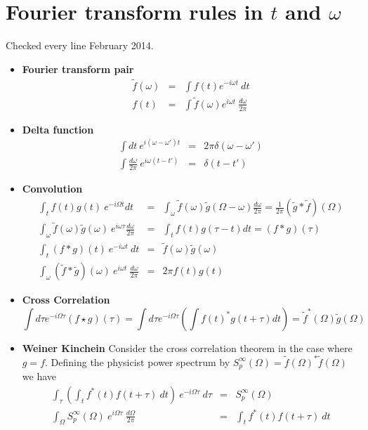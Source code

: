 \documentclass{article}
\begin{document}
\section*{Fourier transform rules in $t$ and $\omega$}

Checked every line February 2014.

\begin{itemize}
\item \textbf{Fourier transform pair} \begin{eqnarray*}
\tilde{f}(\omega) & = & \int f(t)e^{-i\omega t}~dt\\
f(t) & = & \int\tilde{f}(\omega)e^{i\omega t}~\frac{d\omega}{2\pi}\end{eqnarray*}

\item \textbf{Delta function} \begin{eqnarray*}
\int dt~e^{i(\omega-\omega')t} & = & 2\pi\delta(\omega-\omega')\\
\int\frac{d\omega}{2\pi}~e^{i\omega(t-t')} & = & \delta(t-t')\end{eqnarray*}

\item \textbf{Convolution} \begin{eqnarray*}
\int_{t}f(t)g(t)~e^{-i\Omega t}dt & = & \int_{\omega}\tilde{f}(\omega)\tilde{g}(\Omega-\omega)\frac{d\omega}{2\pi}=\frac{1}{2\pi}(\tilde{g}*\tilde{f})(\Omega)\\
\int_{\omega}\tilde{f}(\omega)\tilde{g}(\omega)~e^{i\omega\tau}\frac{d\omega}{2\pi} & = & \int_{t}f(t)g(\tau-t)dt=(f*g)(\tau)\\
\int_{t}(f*g)(t)~e^{-i\omega t}~dt & = & \tilde{f}(\omega)\tilde{g}(\omega)\\
\int_{\omega}(\tilde{f}*\tilde{g})(\omega)~e^{i\omega t}~\frac{d\omega}{2\pi} & = & 2\pi f(t)g(t)\end{eqnarray*}

\item \textbf{Cross Correlation}\begin{equation}
\int d\tau e^{-i\Omega\tau}\left(f\star g\right)(\tau) = \int d\tau e^{-i\Omega\tau}\left(\int f(t)^{*}g(t+\tau)dt\right)=\tilde{f}^{*}(\Omega)\tilde{g}(\Omega) \nonumber \end{equation}

\item \textbf{Weiner Kinchein} Consider the cross correlation theorem in
the case where $g=f$. Defining the physicist power spectrum by $S_{p}^{\infty}(\Omega)=\tilde{f}(\Omega)^{*}\tilde{f}(\Omega)$
we have \begin{eqnarray*}
\int_{\tau}\left(\int_{t}f^{*}(t)f(t+\tau)~dt\right)~e^{-i\Omega\tau}~d\tau & = & S_{p}^{\infty}(\Omega)\\
\int_{\Omega}S_{p}^{\infty}(\Omega)~e^{i\Omega\tau}~\frac{d\Omega}{2\pi} & = & \int_{t}f^{*}(t)f(t+\tau)~dt\end{eqnarray*}
\end{itemize}
\end{document}
